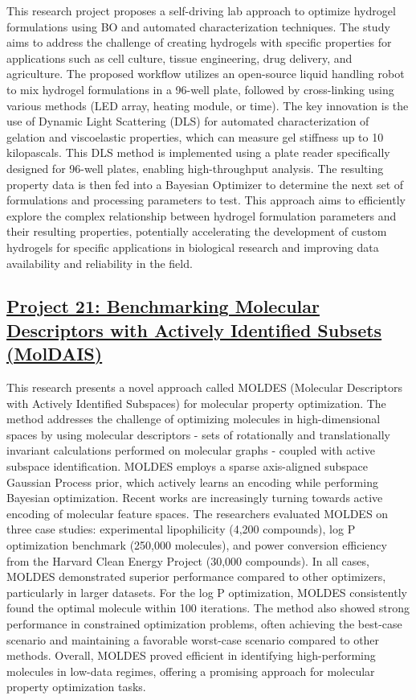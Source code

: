 This research project proposes a self-driving lab approach to optimize hydrogel formulations using BO and automated characterization techniques. The study aims to address the challenge of creating hydrogels with specific properties for applications such as cell culture, tissue engineering, drug delivery, and agriculture. The proposed workflow utilizes an open-source liquid handling robot to mix hydrogel formulations in a 96-well plate, followed by cross-linking using various methods (LED array, heating module, or time). The key innovation is the use of Dynamic Light Scattering (DLS)\cite{stetefeld2016dynamic} for automated characterization of gelation and viscoelastic properties, which can measure gel stiffness up to 10 kilopascals. This DLS method is implemented using a plate reader specifically designed for 96-well plates, enabling high-throughput analysis. The resulting property data is then fed into a Bayesian Optimizer to determine the next set of formulations and processing parameters to test. This approach aims to efficiently explore the complex relationship between hydrogel formulation parameters and their resulting properties, potentially accelerating the development of custom hydrogels for specific applications in biological research and improving data availability and reliability in the field.
 \subsection*{\href{https://www.youtube.com/watch?v=uYXAe3sRUSo}{Project 21: Benchmarking Molecular Descriptors with Actively Identified Subsets (MolDAIS)}}

This research presents a novel approach called MOLDES (Molecular Descriptors with Actively Identified Subspaces) for molecular property optimization. The method addresses the challenge of optimizing molecules in high-dimensional spaces by using molecular descriptors - sets of rotationally and translationally invariant calculations performed on molecular graphs - coupled with active subspace identification. MOLDES employs a sparse axis-aligned subspace Gaussian Process prior, which actively learns an encoding while performing Bayesian optimization. Recent works\cite{sorourifar_accelerating_2024,maus_local_2023} are increasingly turning towards active encoding of molecular feature spaces. The researchers evaluated MOLDES on three case studies: experimental lipophilicity (4,200 compounds), log P optimization benchmark (250,000 molecules), and power conversion efficiency from the Harvard Clean Energy Project (30,000 compounds). In all cases, MOLDES demonstrated superior performance compared to other optimizers, particularly in larger datasets. For the log P optimization, MOLDES consistently found the optimal molecule within 100 iterations. The method also showed strong performance in constrained optimization problems, often achieving the best-case scenario and maintaining a favorable worst-case scenario compared to other methods. Overall, MOLDES proved efficient in identifying high-performing molecules in low-data regimes, offering a promising approach for molecular property optimization tasks.
